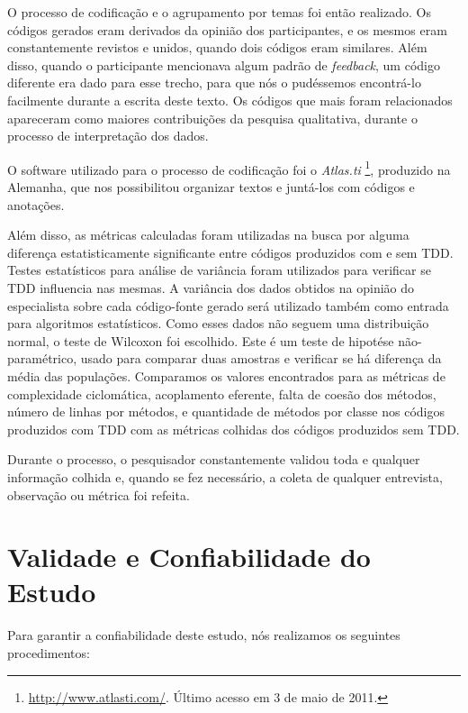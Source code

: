 O processo de codificação e o agrupamento por temas foi então realizado. 
Os códigos gerados eram derivados da opinião dos participantes, e os mesmos 
eram constantemente revistos e unidos, quando dois códigos eram similares.
Além disso, quando o participante mencionava algum padrão de \textit{feedback},
um código diferente era dado para esse trecho, para que nós o pudéssemos encontrá-lo
facilmente durante a escrita deste texto.
Os códigos que mais foram relacionados apareceram como maiores
contribuições da pesquisa qualitativa, durante o processo de interpretação dos
dados. 

O software utilizado para o processo de codificação foi
o \textit{Atlas.ti} \footnote{\url{http://www.atlasti.com/}. Último acesso em 3
de maio de 2011.}, produzido na Alemanha, que nos possibilitou 
organizar textos e juntá-los com códigos e anotações. 

Além disso, as métricas calculadas foram utilizadas na busca por alguma diferença
estatisticamente significante entre códigos produzidos com e sem TDD. 
Testes estatísticos para análise de variância foram utilizados
para verificar se TDD influencia nas mesmas.
A variância dos dados obtidos na opinião do especialista sobre cada código-fonte gerado
será utilizado também como entrada para algoritmos estatísticos. 
Como esses dados não seguem uma distribuição normal, o teste
de Wilcoxon foi escolhido. Este é um teste de hipotése não-paramétrico,
usado para comparar duas amostras e verificar se há diferença da média das populações.
Comparamos os valores encontrados
para as métricas de complexidade ciclomática, acoplamento eferente, falta
de coesão dos métodos, número de linhas por métodos, e quantidade de métodos
por classe nos códigos produzidos com TDD com as métricas colhidas dos
códigos produzidos sem TDD.

Durante o processo, o pesquisador constantemente validou toda e qualquer
informação colhida e, quando se fez necessário, a coleta de qualquer entrevista,
observação ou métrica foi refeita. 

\section{Validade e Confiabilidade do Estudo}
\label{sec:planejamento-validacao}

Para garantir a confiabilidade deste estudo, nós realizamos os
seguintes procedimentos:

